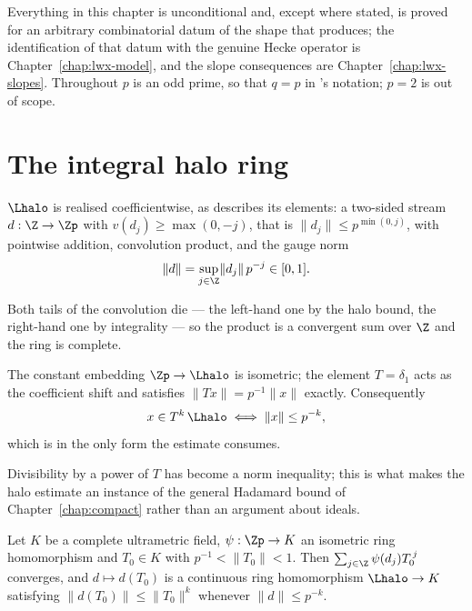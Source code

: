Everything in this chapter is unconditional and, except where stated, is proved for an arbitrary
combinatorial datum of the shape that \cite[Proposition 3.1]{LWX} produces; the identification of
that datum with the genuine Hecke operator is Chapter~\ref{chap:lwx-model}, and the slope
consequences are Chapter~\ref{chap:lwx-slopes}.  Throughout $p$ is an odd prime, so that
$q = p$ in \cite{LWX}'s notation; $p = 2$ is out of scope.

\section{The integral halo ring}

\begin{definition}
  \label{def:haloint}
  \leanok
  $\Lhalo$ is realised coefficientwise, as \cite[proof of Corollary 3.18]{LWX} describes its
  elements: a two-sided stream $d : \Z \to \Zp$ with $v(d_j) \geq \max(0, -j)$, that is
  $\lVert d_j\rVert \leq p^{\min(0,j)}$, with pointwise addition, convolution product, and the
  gauge norm
  \[
    \lVert d\rVert = \sup_{j\in\Z} \lVert d_j \rVert\, p^{-j} \in [0,1] .
  \]
\end{definition}

Both tails of the convolution die --- the left-hand one by the halo bound, the right-hand one by
integrality --- so the product is a convergent sum over $\Z$ and the ring is complete.

\begin{proposition}
  \label{prop:haloint-norm}
  \leanok
  The constant embedding $\Zp \to \Lhalo$ is isometric; the element $T = \delta_1$ acts as the
  coefficient shift and satisfies $\lVert Tx\rVert = p^{-1}\lVert x\rVert$ exactly.
  Consequently
  \[
    x \in T^{k}\,\Lhalo \iff \lVert x\rVert \leq p^{-k},
  \]
  which is \cite[Lemma 3.15]{LWX} in the only form the estimate consumes.
\end{proposition}

Divisibility by a power of $T$ has become a norm inequality; this is what makes the halo estimate
an instance of the general Hadamard bound of Chapter~\ref{chap:compact} rather than an argument
about ideals.

\begin{definition}
  \label{def:halo-specialize}
  \leanok
  Let $K$ be a complete ultrametric field, $\psi : \Zp \to K$ an isometric ring homomorphism and
  $T_0 \in K$ with $p^{-1} < \lVert T_0\rVert < 1$.  Then $\sum_{j\in\Z}\psi(d_j)T_0^{\,j}$
  converges, and $d \mapsto d(T_0)$ is a continuous ring homomorphism $\Lhalo \to K$
  satisfying $\lVert d(T_0)\rVert \leq \lVert T_0\rVert^{k}$ whenever $\lVert d\rVert\leq p^{-k}$.
\end{definition}

